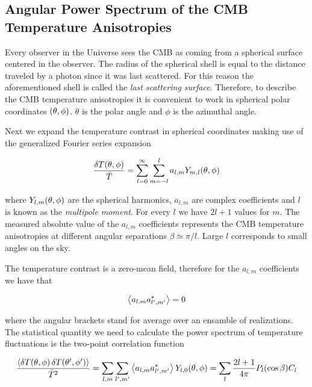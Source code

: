 \subsection{Angular Power Spectrum of the CMB Temperature Anisotropies}

Every observer in the Universe sees the CMB as coming from a spherical
surface centered in the observer. The radius of the spherical shell is
equal to the distance traveled by a photon since it was last scattered.
For this reason the aforementioned shell is called the \emph{last
scattering surface}. Therefore, to describe the CMB temperature
anisotropies it is convenient to work in spherical polar
coordinates $\qty(\theta,\phi)$. $\theta$ is the polar angle and $\phi$ is the
azimuthal angle.

Next we expand the temperature contrast in spherical coordinates making use
of the generalized Fourier series expansion

\begin{equation}
        \frac{\var{T\qty(\theta,\phi)}}{\bar T} =
        \sum^\infty_{l=0}\sum^l_{m=-l} a_{l,m}
        Y_{m,l}\qty(\theta,\phi)
\end{equation}

where $Y_{l,m}\qty(\theta,\phi)$ are the spherical harmonics, $a_{l,m}$ are
complex coefficients and $l$ is known as the \emph{multipole moment}.
For every $l$ we have $2l + 1$ values for $m$.
The measured absolute value of the $a_{l,m}$ coefficients represents the
CMB temperature anisotropies at different angular separations $\beta \simeq
\pi/l$. Large $l$ corresponds to small angles on the sky.

The temperature contrast is a zero-mean field, therefore for the $a_{l,m}$
coefficients we have that

\begin{equation}
        \expval{a_{l,m} a^*_{l',m'}} = 0
\end{equation}

where the angular brackets stand for average over an ensamble of
realizations. The statistical quantity we need to calculate the power
spectrum of temperature fluctuations is the two-point correlation function

\begin{equation}
        \frac{\expval{\var{T\qty(\theta,\phi)} \var{T\qty(\theta',\phi')}}}
        {\bar T^2} =
        \sum_{l,m}\sum_{l',m'} \expval{a_{l,m} a^*_{l',m'}}
        Y_{l,0}\qty(\theta,\phi) =
        \sum_l \frac{2l + 1}{4\pi} P_l\qty(\cos \beta) C_l
\end{equation}

